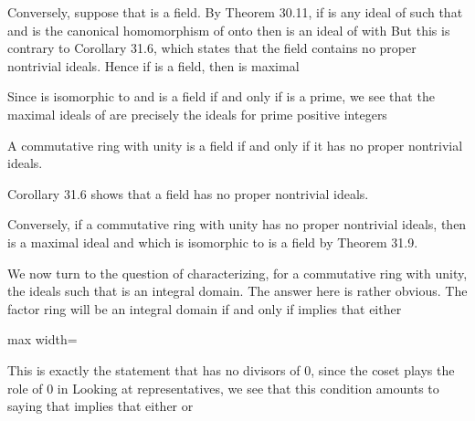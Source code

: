 \documentclass[11pt,oneside]{article}
\begin{document}
\BookNarrativetrue

\begin{BookBody}

Conversely, suppose that  is a field. By Theorem 30.11, if  is any ideal of  such that  and \BookInline{\gamma } is the canonical homomorphism of  onto  then \BookInline{\gamma [N]} is an ideal of  with  But this is contrary to Corollary 31.6, which states that the field  contains no proper nontrivial ideals. Hence if  is a field, then  is maximal\BookEnd{\blacklozenge}

 Since  is isomorphic to  and  is a field if and only if  is a prime, we see that the maximal ideals of  are precisely the ideals  for prime positive integers \BookEnd{\blacktriangle}

 A commutative ring with unity is a field if and only if it has no proper nontrivial ideals.

 Corollary 31.6 shows that a field has no proper nontrivial ideals.

Conversely, if a commutative ring  with unity has no proper nontrivial ideals, then  is a maximal ideal and  which is isomorphic to  is a field by Theorem 31.9. \BookEnd{\blacklozenge}

We now turn to the question of characterizing, for a commutative ring  with unity, the ideals  such that  is an integral domain. The answer here is rather obvious. The factor ring  will be an integral domain if and only if  implies that either

\begin{center}\begin{adjustbox}{max width=\linewidth}\end{adjustbox}\end{center}

\noindent This is exactly the statement that  has no divisors of 0, since the coset  plays the role of 0 in  Looking at representatives, we see that this condition amounts to saying that  implies that either  or 


\end{BookBody}
\end{document}
